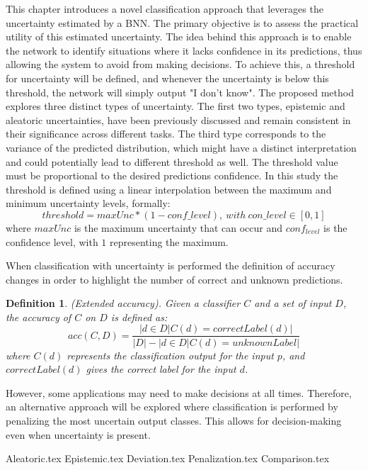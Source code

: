 \documentclass[
	12pt,
	a4paper,
	cleardoublepage=empty,
	headings=twolinechapter,
	numbers=autoenddot,
]{scrbook}
\newtheorem{definition}{Definition}[section]
\begin{document}
	This chapter introduces a novel classification approach that leverages the uncertainty estimated by a BNN. The primary objective is to assess the practical utility of this estimated uncertainty. The idea behind this approach is to enable the network to identify situations where it lacks confidence in its predictions, thus allowing the system to avoid from making decisions. To achieve this, a threshold for uncertainty will be defined, and whenever the uncertainty is below this threshold, the network will simply output "I don't know". 
	The proposed method explores three distinct types of uncertainty. The first two types, epistemic and aleatoric uncertainties, have been previously discussed and remain consistent in their significance across different tasks. The third type corresponds to the variance of the predicted distribution, which might have a distinct interpretation and could potentially lead to different threshold as well. The threshold value must be proportional to the desired predictions confidence. In this study the threshold is defined using a linear interpolation between the maximum and minimum uncertainty levels, formally:
	\[
		threshold = maxUnc * (1 - conf \_ level), \ with \ con \_ level \in [0,1]
	\]
	where $maxUnc$ is the maximum uncertainty that can occur and $conf_{level}$ is the confidence level, with $1$ representing the maximum.

	When classification with uncertainty is performed the definition of accuracy changes in order to highlight the number of correct and unknown predictions.
	
	\begin{definition} (Extended accuracy).
		Given a classifier $C$ and a set of input $D$, the accuracy of $C$ on $D$ is defined as:
		\[
			acc(C,D) = \frac{|{d \in D | C(d) = correctLabel(d)}|}{|D| - |{d \in D | C(d) = unknownLabel}|}
		\] 
		where $C(d)$ represents the classification output for the input $p$, and $correctLabel(d)$ gives the correct label for the input $d$.
	\end{definition}
	
	However, some applications may need to make decisions at all times. Therefore, an alternative approach will be explored where classification is performed by penalizing the most uncertain output classes. This allows for decision-making even when uncertainty is present.
	
	{Aleatoric.tex}
	{Epistemic.tex}
	{Deviation.tex}
	{Penalization.tex}
	{Comparison.tex}
	
\end{document}
